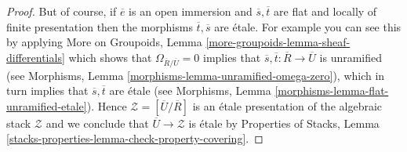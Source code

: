 \documentclass[10pt,a4paper]{amsart}
\theoremstyle{plain}
\theoremstyle{definition}
\theoremstyle{remark}
\numberwithin{equation}{subsection}
\begin{document}
\begin{proof}
\medskip\noindent
But of course, if $\overline{e}$ is an open immersion and
$\overline{s}, \overline{t}$ are flat and locally of finite presentation
then the morphisms $\overline{t}, \overline{s}$ are \'etale.
For example you can see this by applying
More on Groupoids, Lemma \ref{more-groupoids-lemma-sheaf-differentials}
which shows that $\Omega_{\overline{R}/\overline{U}} = 0$
implies that $\overline{s}, \overline{t} : \overline{R} \to \overline{U}$
is unramified (see
Morphisms, Lemma \ref{morphisms-lemma-unramified-omega-zero}),
which in turn implies that $\overline{s}, \overline{t}$ are \'etale
(see
Morphisms, Lemma \ref{morphisms-lemma-flat-unramified-etale}).
Hence $\mathcal{Z} = [\overline{U}/\overline{R}]$ is an \'etale
presentation of the algebraic stack $\mathcal{Z}$ and we conclude that
$\overline{U} \to \mathcal{Z}$ is \'etale by
Properties of Stacks, Lemma
\ref{stacks-properties-lemma-check-property-covering}.
\end{proof}
\end{document}
